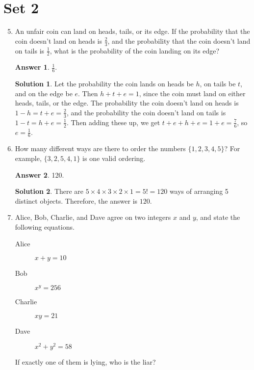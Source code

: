 \documentclass[11pt]{article}
\theoremstyle{definition}
\newtheorem*{solution}{Solution}
\newtheorem*{answer}{Answer}
\begin{document}
\section*{Set 2}
\begin{enumerate}
\setcounter{enumi}{4}

\item An unfair coin can land on heads, tails, or its edge. If the probability that the coin doesn’t land on heads is $\frac{2}{3}$, and the probability that the coin doesn’t land on tails is $\frac{1}{2}$, what is the probability of the coin landing on its edge?

\begin{answer}
$\frac{1}{6}$.
\end{answer}
\begin{solution} Let the probability the coin lands on heads be $h$, on tails be $t$, and on the edge be $e$. Then $h+t+e = 1$, since the coin must land on either heads, tails, or the edge. The probability the coin doesn't land on heads is $1-h = t+e = \frac{2}{3}$, and the probability the coin doesn't land on tails is $1-t = h+e = \frac{1}{2}$. Then adding these up, we get $t+e+h+e = 1+e = \frac{7}{6}$, so $e = \boxed{\frac{1}{6}}$.

\end{solution}

\item How many different ways are there to order the numbers $\{1,2,3,4,5\}$? For example, $\{3,2,5,4,1\}$ is one valid ordering.

\begin{answer}
120.
\end{answer}
\begin{solution} There are $5\times4\times3\times2\times1 = 5! = 120$ ways of arranging 5 distinct objects. Therefore, the answer is $\boxed{120}$.

\end{solution}

\item Alice, Bob, Charlie, and Dave agree on two integers $x$ and $y$, and state the following equations. %
\begin{description}
\item[Alice] $x + y = 10$
\item[Bob] $x^y = 256$
\item[Charlie] $xy = 21$
\item[Dave] $x^2 + y^2 = 58$
\end{description}
If exactly one of them is lying, who is the liar?


\end{enumerate}
\end{document}
